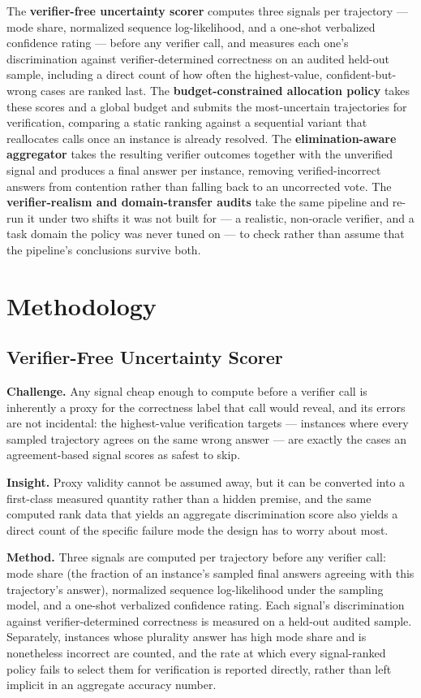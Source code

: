 \documentclass[11pt]{article}
\begin{document}
The \textbf{verifier-free uncertainty scorer} computes three signals per trajectory --- mode share, normalized sequence log-likelihood, and a one-shot verbalized confidence rating --- before any verifier call, and measures each one's discrimination against verifier-determined correctness on an audited held-out sample, including a direct count of how often the highest-value, confident-but-wrong cases are ranked last. The \textbf{budget-constrained allocation policy} takes these scores and a global budget and submits the most-uncertain trajectories for verification, comparing a static ranking against a sequential variant that reallocates calls once an instance is already resolved. The \textbf{elimination-aware aggregator} takes the resulting verifier outcomes together with the unverified signal and produces a final answer per instance, removing verified-incorrect answers from contention rather than falling back to an uncorrected vote. The \textbf{verifier-realism and domain-transfer audits} take the same pipeline and re-run it under two shifts it was not built for --- a realistic, non-oracle verifier, and a task domain the policy was never tuned on --- to check rather than assume that the pipeline's conclusions survive both.

\section{Methodology}

\subsection{Verifier-Free Uncertainty Scorer}
\textbf{Challenge.} Any signal cheap enough to compute before a verifier call is inherently a proxy for the correctness label that call would reveal, and its errors are not incidental: the highest-value verification targets --- instances where every sampled trajectory agrees on the same wrong answer --- are exactly the cases an agreement-based signal scores as safest to skip.

\textbf{Insight.} Proxy validity cannot be assumed away, but it can be converted into a first-class measured quantity rather than a hidden premise, and the same computed rank data that yields an aggregate discrimination score also yields a direct count of the specific failure mode the design has to worry about most.

\textbf{Method.} Three signals are computed per trajectory before any verifier call: mode share (the fraction of an instance's sampled final answers agreeing with this trajectory's answer), normalized sequence log-likelihood under the sampling model, and a one-shot verbalized confidence rating. Each signal's discrimination against verifier-determined correctness is measured on a held-out audited sample. Separately, instances whose plurality answer has high mode share and is nonetheless incorrect are counted, and the rate at which every signal-ranked policy fails to select them for verification is reported directly, rather than left implicit in an aggregate accuracy number.
\end{document}
